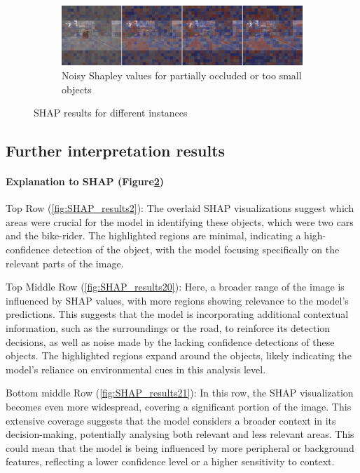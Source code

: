 \begin{figure}[ht!]
    \hfill
    \begin{subfigure}[b]{\textwidth}
        \includegraphics[width=\textwidth]{figures/output2,2}
        \caption{Noisy Shapley values for partially occluded or too small objects }\label{fig:SHAP_results22}
    \end{subfigure}
    \caption{SHAP results for different instances}
    \label{fig:SHAP_results_combined}
\end{figure}
\subsection{Further interpretation results}
\paragraph{Explanation to SHAP (Figure\ref{fig:SHAP_results_combined})}


Top Row (\ref{fig:SHAP_results2}): The overlaid SHAP visualizations suggest which areas were crucial for the model in identifying these objects, which were two cars and the bike-rider.
The highlighted regions are minimal, indicating a high-confidence detection of the object, with the model focusing specifically on the relevant parts of the image.

Top Middle Row (\ref{fig:SHAP_results20}): Here, a broader range of the image is influenced by SHAP values, with more regions showing relevance to the model's predictions.
This suggests that the model is incorporating additional contextual information, such as the surroundings or the road, to reinforce its detection decisions, as well as noise made by the lacking confidence detections of these objects.
The highlighted regions expand around the objects, likely indicating the model's reliance on environmental cues in this analysis level.

Bottom middle Row (\ref{fig:SHAP_results21}): In this row, the SHAP visualization becomes even more widespread, covering a significant portion of the image. This extensive coverage suggests that the model considers a broader context in its decision-making, potentially analysing both relevant and less relevant areas. This could mean that the model is being influenced by more peripheral or background features, reflecting a lower confidence level or a higher sensitivity to context.

